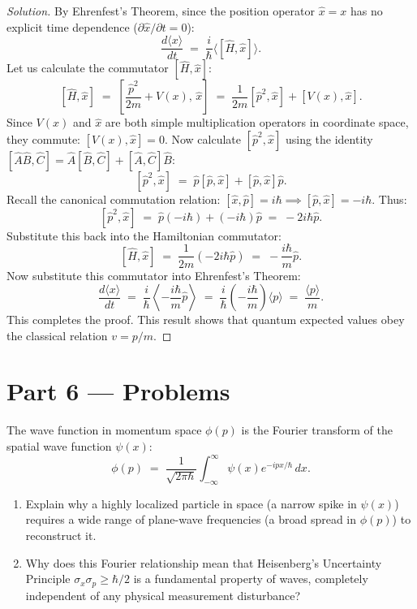 \documentclass[12pt, a4paper, twoside]{book}
\newcounter{problem}[chapter]
\begin{document}
\begin{proof}[Solution]
By Ehrenfest's Theorem, since the position operator $\hat{x} = x$ has no explicit time dependence ($\partial \hat{x}/\partial t = 0$):
\[
  \frac{d\langle x \rangle}{dt} \;=\; \frac{i}{\hbar} \langle [\hat{H}, \hat{x}] \rangle.
\]
Let us calculate the commutator $[\hat{H}, \hat{x}]$:
\[
  [\hat{H}, \hat{x}] \;=\; \left[ \frac{\hat{p}^2}{2m} + V(x), \, \hat{x} \right] \;=\; \frac{1}{2m} [\hat{p}^2, \hat{x}] + [V(x), \hat{x}].
\]
Since $V(x)$ and $\hat{x}$ are both simple multiplication operators in coordinate space, they commute: $[V(x), \hat{x}] = 0$.
Now calculate $[\hat{p}^2, \hat{x}]$ using the identity $[\hat{A}\hat{B}, \hat{C}] = \hat{A}[\hat{B}, \hat{C}] + [\hat{A}, \hat{C}]\hat{B}$:
\[
  [\hat{p}^2, \hat{x}] \;=\; \hat{p}[\hat{p}, \hat{x}] + [\hat{p}, \hat{x}]\hat{p}.
\]
Recall the canonical commutation relation: $[\hat{x}, \hat{p}] = i\hbar \implies [\hat{p}, \hat{x}] = -i\hbar$. Thus:
\[
  [\hat{p}^2, \hat{x}] \;=\; \hat{p}(-i\hbar) + (-i\hbar)\hat{p} \;=\; -2i\hbar \hat{p}.
\]
Substitute this back into the Hamiltonian commutator:
\[
  [\hat{H}, \hat{x}] \;=\; \frac{1}{2m} (-2i\hbar \hat{p}) \;=\; -\frac{i\hbar}{m} \hat{p}.
\]
Now substitute this commutator into Ehrenfest's Theorem:
\[
  \frac{d\langle x \rangle}{dt} \;=\; \frac{i}{\hbar} \left\langle -\frac{i\hbar}{m} \hat{p} \right\rangle \;=\; \frac{i}{\hbar} \left(-\frac{i\hbar}{m}\right) \langle p \rangle \;=\; \frac{\langle p \rangle}{m}.
\]
This completes the proof. This result shows that quantum expected values obey the classical relation $v = p/m$.
\end{proof}

\newpage

\section{Part 6 --- Problems}

\begin{problem}
The wave function in momentum space $\phi(p)$ is the Fourier transform of the spatial wave function $\psi(x)$:
\[
  \phi(p) \;=\; \frac{1}{\sqrt{2\pi\hbar}} \int_{-\infty}^\infty \psi(x) e^{-i p x/\hbar} \, dx.
\]
\begin{enumerate}[label=(\alph*)]
  \item Explain why a highly localized particle in space (a narrow spike in $\psi(x)$) requires a wide range of plane-wave frequencies (a broad spread in $\phi(p)$) to reconstruct it.
  \item Why does this Fourier relationship mean that Heisenberg's Uncertainty Principle $\sigma_x \sigma_p \ge \hbar/2$ is a fundamental property of waves, completely independent of any physical measurement disturbance?
\end{enumerate}
\end{problem}
\end{document}
